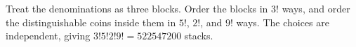 Treat the denominations as three blocks. Order the blocks in $3!$ ways, and order the distinguishable coins inside them in $5!$, $2!$, and $9!$ ways. The choices are independent, giving $3!5!2!9!=\boxed{522547200}$ stacks.
